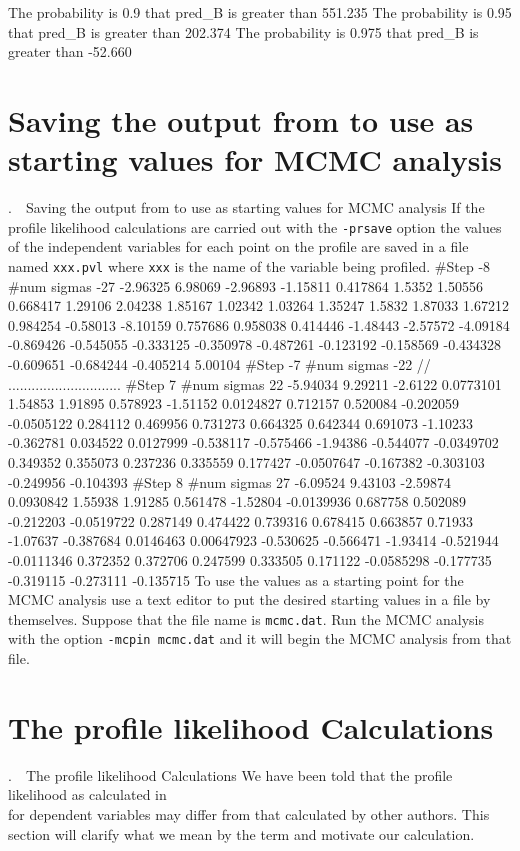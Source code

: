 \documentclass[12pt]{book}
\makeatletter
\def\mysection#1{\section{#1}{\bigbf \medbreak\noindent\number\c@chapter.\number\c@section\ \ #1\medbreak}}
\makeatother
\begin{document}
The probability is     0.9 that pred_B is greater than  551.235
The probability is    0.95 that pred_B is greater than  202.374
The probability is   0.975 that pred_B is greater than  -52.660
\endexample
\mysection{Saving the output from \apl to use as starting values
for MCMC analysis}
If the profile likelihood calculations are carried out with the
{\tt -prsave} option the values of the independent variables 
for each point on the profile are saved in a file named
{\tt xxx.pvl} where {\tt xxx} is the name of the variable
being profiled. 
\beginexample
#Step -8
#num sigmas -27
 -2.96325 6.98069 -2.96893 -1.15811 0.417864 1.5352 1.50556 
 0.668417 1.29106 2.04238 1.85167 1.02342 1.03264 1.35247 
 1.5832 1.87033 1.67212 0.984254 -0.58013 -8.10159 0.757686 
 0.958038 0.414446 -1.48443 -2.57572 -4.09184 -0.869426 -0.545055 
 -0.333125 -0.350978 -0.487261 -0.123192 -0.158569 -0.434328 
 -0.609651 -0.684244 -0.405214 5.00104
#Step -7
#num sigmas -22
  // .............................
#Step 7
#num sigmas 22
 -5.94034 9.29211 -2.6122 0.0773101 1.54853 1.91895 0.578923 
-1.51152 0.0124827 0.712157 0.520084 -0.202059 -0.0505122 
0.284112 0.469956 0.731273 0.664325 0.642344 0.691073 
-1.10233 -0.362781 0.034522 0.0127999 -0.538117 -0.575466 
-1.94386 -0.544077 -0.0349702 0.349352 0.355073 0.237236 
0.335559 0.177427 -0.0507647 -0.167382 -0.303103 -0.249956 -0.104393
#Step 8
#num sigmas 27
 -6.09524 9.43103 -2.59874 0.0930842 1.55938 
1.91285 0.561478 -1.52804 -0.0139936 0.687758 0.502089 
-0.212203 -0.0519722 0.287149 0.474422 0.739316 0.678415 
0.663857 0.71933 -1.07637 -0.387684 0.0146463 0.00647923 
-0.530625 -0.566471 -1.93414 -0.521944 -0.0111346 0.372352 
0.372706 0.247599 0.333505 0.171122 -0.0585298 -0.177735 
-0.319115 -0.273111 -0.135715
\endexample
To use the values as a starting point for the MCMC analysis
use a text editor to put the desired starting values in a file
by themselves. Suppose that the file name is {\tt mcmc.dat}.
Run the MCMC analysis with the option {\tt -mcpin mcmc.dat}
and it will begin the MCMC analysis from that file. 

\mysection{The profile likelihood Calculations}
We have been told that the profile likelihood as calculated in \ADM\\
for dependent variables may differ from that calculated by other authors.
This section will clarify what we mean by the term and motivate our
calculation.  
\end{document}
